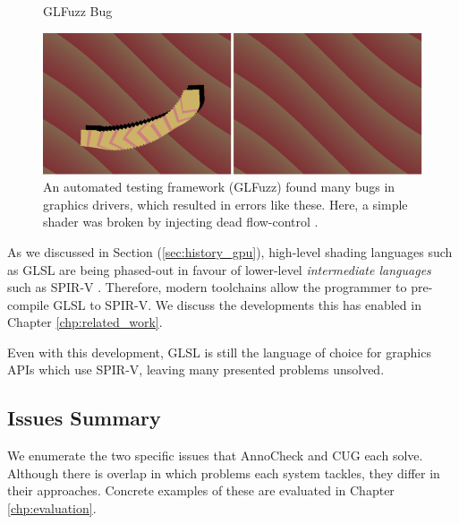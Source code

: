 \documentclass[a4paper,12pt,twoside,openright]{report}
\begin{document}
\begin{figure}[h]
\begin{center}
GLFuzz Bug
\end{center}
\centering
\includegraphics[width=0.8\linewidth]{glfuzz}
\caption{An automated testing framework (GLFuzz) found many bugs in graphics drivers,
which resulted in errors like these. Here, a simple shader was broken by
injecting dead flow-control \cite{GLFuzz}.}
\label{fig:glfuzz}
\end{figure}

As we discussed in Section (\ref{sec:history_gpu}), high-level shading
languages such as GLSL are being phased-out in favour of lower-level
\textit{intermediate languages} such as SPIR-V \cite{SPIRV}. Therefore, modern
toolchains allow the programmer to pre-compile GLSL to SPIR-V. We discuss the
developments this has enabled in Chapter \ref{chp:related_work}.

Even with this development, GLSL is still the language of choice for graphics
APIs which use SPIR-V, leaving many presented problems unsolved.

\subsection{Issues Summary}

\label{sec:issues_summary}

We enumerate the two specific issues that AnnoCheck and CUG each solve.
Although there is overlap in which problems each system tackles, they differ in
their approaches. Concrete examples of these are evaluated in Chapter
\ref{chp:evaluation}.
\end{document}
